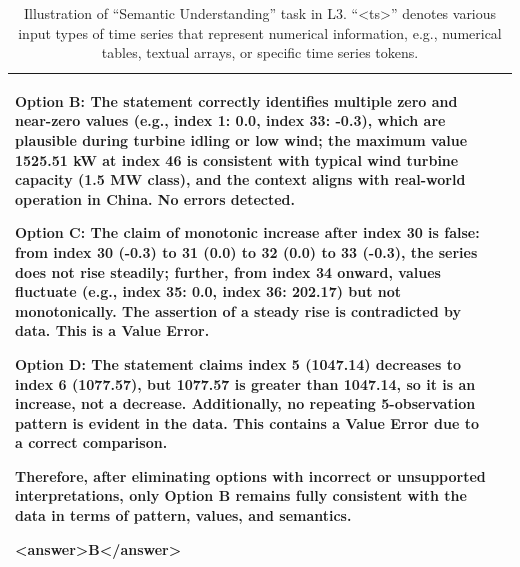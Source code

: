 \documentclass[11pt]{article}
\begin{document}
\begin{table}[t]
\begin{tabularx}{\textwidth}{@{}>{\bfseries}p{1.8cm}X@{}}
{Option B: The statement correctly identifies multiple zero and near-zero values (e.g., index 1: 0.0, index 33: -0.3), which are plausible during turbine idling or low wind; the maximum value 1525.51 kW at index 46 is consistent with typical wind turbine capacity (1.5 MW class), and the context aligns with real-world operation in China. No errors detected.\par

Option C: The claim of monotonic increase after index 30 is false: from index 30 (-0.3) to 31 (0.0) to 32 (0.0) to 33 (-0.3), the series does not rise steadily; further, from index 34 onward, values fluctuate (e.g., index 35: 0.0, index 36: 202.17) but not monotonically. The assertion of a steady rise is contradicted by data. This is a Value Error.\par

Option D: The statement claims index 5 (1047.14) decreases to index 6 (1077.57), but 1077.57 is greater than 1047.14, so it is an increase, not a decrease. Additionally, no repeating 5-observation pattern is evident in the data. This contains a Value Error due to a correct comparison.

Therefore, after eliminating options with incorrect or unsupported interpretations, only \textbf{Option B} remains fully consistent with the data in terms of pattern, values, and semantics.\par

<answer>B</answer>

}\\
\bottomrule
\end{tabularx}
\caption{Illustration of ``Semantic Understanding'' task in L3. ``<ts>'' denotes various input types of time series that represent numerical information, e.g., numerical tables, textual arrays, or specific time series tokens.}
\label{tab:l3_example}
\end{table}
\end{document}
